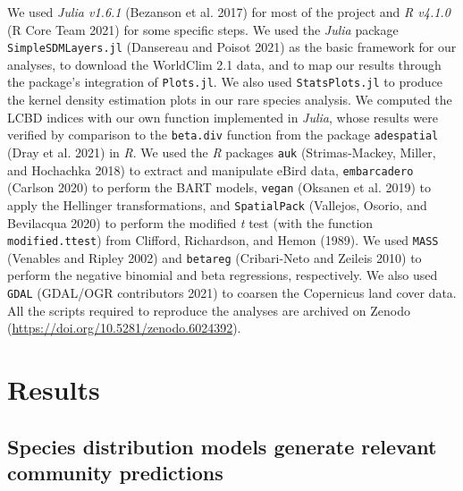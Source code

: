 \documentclass[10pt,oneside]{article}
\begin{document}
We used \emph{Julia v1.6.1} (Bezanson et al. 2017) for most of the
project and \emph{R v4.1.0} (R Core Team 2021) for some specific steps.
We used the \emph{Julia} package \texttt{SimpleSDMLayers.jl} (Dansereau
and Poisot 2021) as the basic framework for our analyses, to download
the WorldClim 2.1 data, and to map our results through the package's
integration of \texttt{Plots.jl}. We also used \texttt{StatsPlots.jl} to
produce the kernel density estimation plots in our rare species
analysis. We computed the LCBD indices with our own function implemented
in \emph{Julia}, whose results were verified by comparison to the
\texttt{beta.div} function from the package \texttt{adespatial} (Dray et
al. 2021) in \emph{R}. We used the \emph{R} packages \texttt{auk}
(Strimas-Mackey, Miller, and Hochachka 2018) to extract and manipulate
eBird data, \texttt{embarcadero} (Carlson 2020) to perform the BART
models, \texttt{vegan} (Oksanen et al. 2019) to apply the Hellinger
transformations, and \texttt{SpatialPack} (Vallejos, Osorio, and
Bevilacqua 2020) to perform the modified \emph{t} test (with the
function \texttt{modified.ttest}) from Clifford, Richardson, and Hemon
(1989). We used \texttt{MASS} (Venables and Ripley 2002) and
\texttt{betareg} (Cribari-Neto and Zeileis 2010) to perform the negative
binomial and beta regressions, respectively. We also used \texttt{GDAL}
(GDAL/OGR contributors 2021) to coarsen the Copernicus land cover data.
All the scripts required to reproduce the analyses are archived on
Zenodo (\url{https://doi.org/10.5281/zenodo.6024392}).

\hypertarget{results}{%
\section{Results}\label{results}}

\hypertarget{species-distribution-models-generate-relevant-community-predictions}{%
\subsection{Species distribution models generate relevant community
predictions}\label{species-distribution-models-generate-relevant-community-predictions}}
\end{document}

